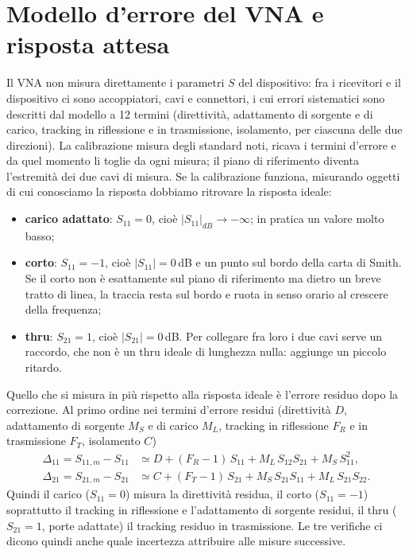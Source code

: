 \documentclass[11pt,a4paper,oneside]{book}
\begin{document}
\section{Modello d'errore del VNA e risposta attesa}
Il VNA non misura direttamente i parametri $S$ del dispositivo: fra i ricevitori e il dispositivo ci sono accoppiatori, cavi e connettori, i cui errori sistematici sono descritti dal modello a 12 termini (direttività, adattamento di sorgente e di carico, tracking in riflessione e in trasmissione, isolamento, per ciascuna delle due direzioni). La calibrazione misura degli standard noti, ricava i termini d'errore e da quel momento li toglie da ogni misura; il piano di riferimento diventa l'estremità dei due cavi di misura. Se la calibrazione funziona, misurando oggetti di cui conosciamo la risposta dobbiamo ritrovare la risposta ideale:
\begin{itemize}
  \item \textbf{carico adattato}: $S_{11} = 0$, cioè $|S_{11}|_{dB}\to-\infty$; in pratica un valore molto basso;
  \item \textbf{corto}: $S_{11} = -1$, cioè $|S_{11}| = 0$\,dB e un punto sul bordo della carta di Smith. Se il corto non è esattamente sul piano di riferimento ma dietro un breve tratto di linea, la traccia resta sul bordo e ruota in senso orario al crescere della frequenza;
  \item \textbf{thru}: $S_{21} = 1$, cioè $|S_{21}| = 0$\,dB. Per collegare fra loro i due cavi serve un raccordo, che non è un thru ideale di lunghezza nulla: aggiunge un piccolo ritardo.
\end{itemize}
Quello che si misura in più rispetto alla risposta ideale è l'errore residuo dopo la correzione. Al primo ordine nei termini d'errore residui (direttività $D$, adattamento di sorgente $M_S$ e di carico $M_L$, tracking in riflessione $F_R$ e in trasmissione $F_T$, isolamento $C$)
\begin{align}
\Delta_{11} = S_{11,m}-S_{11} &\simeq D + (F_R-1)\,S_{11} + M_L\,S_{12}S_{21} + M_S\,S_{11}^2, \\
\Delta_{21} = S_{21,m}-S_{21} &\simeq C + (F_T-1)\,S_{21} + M_S\,S_{21}S_{11} + M_L\,S_{21}S_{22}.
\end{align}
Quindi il carico ($S_{11} = 0$) misura la direttività residua, il corto ($S_{11} = -1$) soprattutto il tracking in riflessione e l'adattamento di sorgente residui, il thru ($S_{21} = 1$, porte adattate) il tracking residuo in trasmissione. Le tre verifiche ci dicono quindi anche quale incertezza attribuire alle misure successive.
\end{document}
